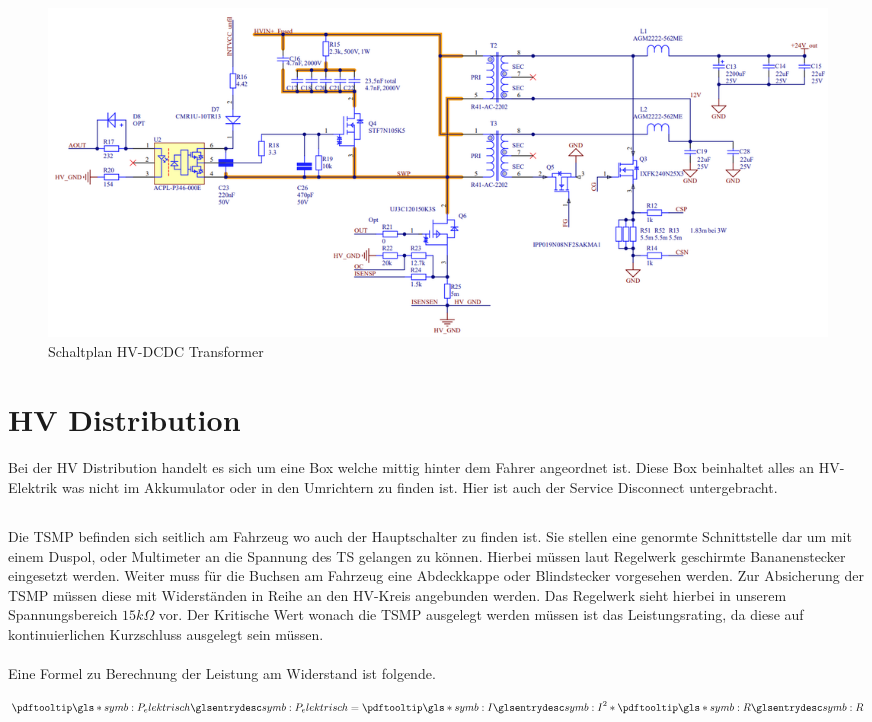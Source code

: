 \begin{figure}
	\centering
	\includegraphics[width=1\linewidth]{bilder/HVDCDC_Transformer_Schematic}
	\caption{Schaltplan \ac{HV}-DCDC Transformer}
	\label{fig:hvdcdctransformerschematic}
\end{figure}

\FloatBarrier
\section{HV Distribution}
Bei der HV Distribution handelt es sich um eine Box welche mittig hinter dem Fahrer angeordnet ist. Diese Box beinhaltet alles an \ac{HV}-Elektrik was nicht im Akkumulator oder in den Umrichtern zu finden ist. Hier ist auch der Service Disconnect untergebracht.

\FloatBarrier
\subsection{}
Die \ac{TSMP} befinden sich seitlich am Fahrzeug wo auch der Hauptschalter zu finden ist. Sie stellen eine genormte Schnittstelle dar um mit einem Duspol, oder Multimeter an die Spannung des \ac{TS} gelangen zu können. Hierbei müssen laut Regelwerk \cite{FSRules} geschirmte Bananenstecker eingesetzt werden. Weiter muss für die Buchsen am Fahrzeug eine Abdeckkappe oder Blindstecker vorgesehen werden. Zur Absicherung der \ac{TSMP} müssen diese mit Widerständen in Reihe an den \ac{HV}-Kreis angebunden werden. Das Regelwerk sieht hierbei in unserem Spannungsbereich \ensuremath{15k\Omega} vor. Der Kritische Wert wonach die \ac{TSMP} ausgelegt werden müssen ist das Leistungsrating, da diese auf kontinuierlichen Kurzschluss ausgelegt sein müssen.
\\
\\
Eine Formel zu Berechnung der Leistung am Widerstand ist folgende.

\begin{equation}
	\label{eqn:Leistung am Wiederstand}
	\glsc{symb:P_elektrisch} = \glsc{symb:I}^{2} * \glsc{symb:R}
\end{equation}

